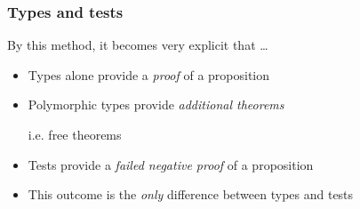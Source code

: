 \begin{frame}[fragile]
\frametitle{Types and tests}
\begin{block}{By this method, it becomes very explicit that \ldots}
\begin{itemize}
\item Types alone provide a \emph{proof} of a proposition
\item Polymorphic types provide \emph{additional theorems}
      
      i.e. free theorems
\item Tests provide a \emph{failed negative proof} of a proposition
\item This outcome is the \emph{only} difference between types and tests
\end{itemize}
\end{block}
\end{frame}
